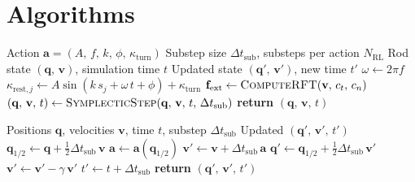 \documentclass[11pt]{article}
\newcommand{\vect}[1]{\mathbf{#1}}
\newcommand{\dtsub}{\Delta t_{\mathrm{sub}}}
\newcommand{\Nrl}{N_{\mathrm{RL}}}
\begin{document}
\section{Algorithms}
\label{sec:algorithms}

\begin{algorithm}[t]
\caption{Single RL Step with PyElastica Integration}\label{alg:rl-step}
\begin{algorithmic}[1]
\Require Action $\vect{a} = (A,\, f,\, k,\, \phi,\, \kappa_{\mathrm{turn}})$
\Require Substep size $\dtsub$, substeps per action $\Nrl$
\Require Rod state $(\vect{q},\, \vect{v})$, simulation time $t$
\Ensure Updated state $(\vect{q}',\, \vect{v}')$, new time $t'$
\State $\omega \gets 2\pi f$ 
\For{$i = 1$ \textbf{to} $\Nrl$}
     
        \State $\kappa_{\mathrm{rest},j} \gets A \sin(k\, s_j + \omega\, t + \phi) + \kappa_{\mathrm{turn}}$
    \EndFor
    \State $\vect{f}_{\mathrm{ext}} \gets \Call{ComputeRFT}{\vect{v},\, c_t,\, c_n}$ 
    \State $(\vect{q},\, \vect{v},\, t) \gets \Call{SymplecticStep}{\vect{q},\, \vect{v},\, t,\, \dtsub}$
\EndFor
\State \textbf{return} $(\vect{q},\, \vect{v},\, t)$
\end{algorithmic}
\end{algorithm}

\begin{algorithm}[t]
\caption{Position Verlet Substep (\textsc{SymplecticStep})}\label{alg:verlet}
\begin{algorithmic}[1]
\Require Positions $\vect{q}$, velocities $\vect{v}$, time $t$, substep $\dtsub$
\Ensure Updated $(\vect{q}',\, \vect{v}',\, t')$
\State $\vect{q}_{1/2} \gets \vect{q} + \frac{1}{2}\dtsub\,\vect{v}$
\State $\vect{a} \gets \vect{a}(\vect{q}_{1/2})$
\State $\vect{v}' \gets \vect{v} + \dtsub\,\vect{a}$
\State $\vect{q}' \gets \vect{q}_{1/2} + \frac{1}{2}\dtsub\,\vect{v}'$
\State $\vect{v}' \gets \vect{v}' - \gamma\,\vect{v}'$
\State $t' \gets t + \dtsub$
\State \textbf{return} $(\vect{q}',\, \vect{v}',\, t')$
\end{algorithmic}
\end{algorithm}
\end{document}

